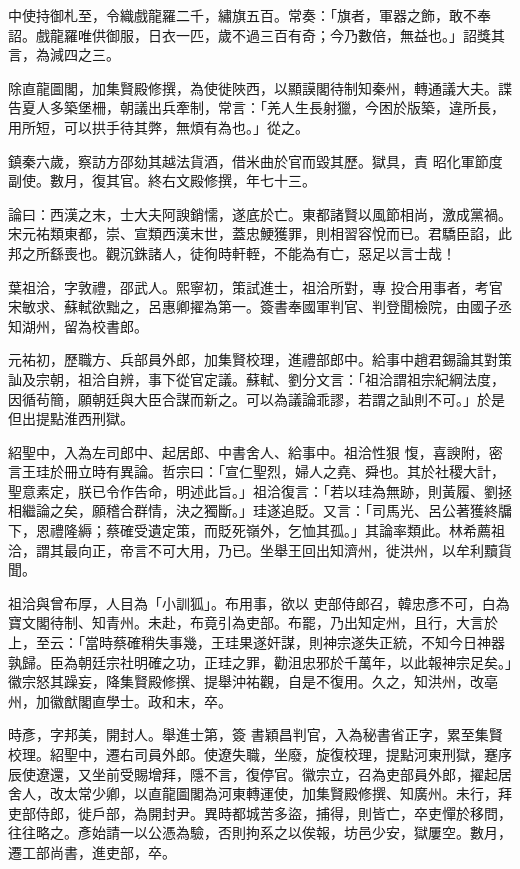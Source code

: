 \begin{pinyinscope}
 中使持御札至，令織戲龍羅二千，繡旗五百。常奏：「旗者，軍器之飾，敢不奉詔。戲龍羅唯供御服，日衣一匹，歲不過三百有奇；今乃數倍，無益也。」詔獎其言，為減四之三。



 除直龍圖閣，加集賢殿修撰，為使徙陜西，以顯謨閣待制知秦州，轉通議大夫。諜告夏人多築堡柵，朝議出兵牽制，常言：「羌人生長射獵，今困於版築，違所長，用所短，可以拱手待其弊，無煩有為也。」從之。



 鎮秦六歲，察訪方邵劾其越法貨酒，借米曲於官而毀其歷。獄具，責
 昭化軍節度副使。數月，復其官。終右文殿修撰，年七十三。



 論曰：西漢之末，士大夫阿諛銷懦，遂底於亡。東都諸賢以風節相尚，激成黨禍。宋元祐類東都，崇、宣類西漢末世，蓋忠鯁獲罪，則相習容悅而已。君驕臣諂，此邦之所繇喪也。觀沉銖諸人，徒徇時軒輊，不能為有亡，惡足以言士哉！



 葉祖洽，字敦禮，邵武人。熙寧初，策試進士，祖洽所對，專
 投合用事者，考官宋敏求、蘇軾欲黜之，呂惠卿擢為第一。簽書奉國軍判官、判登聞檢院，由國子丞知湖州，留為校書郎。



 元祐初，歷職方、兵部員外郎，加集賢校理，進禮部郎中。給事中趙君錫論其對策訕及宗朝，祖洽自辨，事下從官定議。蘇軾、劉分文言：「祖洽謂祖宗紀綱法度，因循茍簡，願朝廷與大臣合謀而新之。可以為議論乖謬，若謂之訕則不可。」於是但出提點淮西刑獄。



 紹聖中，入為左司郎中、起居郎、中書舍人、給事中。祖洽性狠
 愎，喜諛附，密言王珪於冊立時有異論。哲宗曰：「宣仁聖烈，婦人之堯、舜也。其於社稷大計，聖意素定，朕已令作告命，明述此旨。」祖洽復言：「若以珪為無跡，則黃履、劉拯相繼論之矣，願稽合群情，決之獨斷。」珪遂追貶。又言：「司馬光、呂公著獲終牖下，恩禮隆縟；蔡確受遺定策，而貶死嶺外，乞恤其孤。」其論率類此。林希薦祖洽，謂其最向正，帝言不可大用，乃已。坐舉王回出知濟州，徙洪州，以牟利黷貨聞。



 祖洽與曾布厚，人目為「小訓狐」。布用事，欲以
 吏部侍郎召，韓忠彥不可，白為寶文閣待制、知青州。未赴，布竟引為吏部。布罷，乃出知定州，且行，大言於上，至云：「當時蔡確稍失事幾，王珪果遂奸謀，則神宗遂失正統，不知今日神器孰歸。臣為朝廷宗社明確之功，正珪之罪，勸沮忠邪於千萬年，以此報神宗足矣。」徽宗怒其躁妄，降集賢殿修撰、提舉沖祐觀，自是不復用。久之，知洪州，改亳州，加徽猷閣直學士。政和末，卒。



 時彥，字邦美，開封人。舉進士第，簽
 書穎昌判官，入為秘書省正字，累至集賢校理。紹聖中，遷右司員外郎。使遼失職，坐廢，旋復校理，提點河東刑獄，蹇序辰使遼還，又坐前受賜增拜，隱不言，復停官。徽宗立，召為吏部員外郎，擢起居舍人，改太常少卿，以直龍圖閣為河東轉運使，加集賢殿修撰、知廣州。未行，拜吏部侍郎，徙戶部，為開封尹。異時都城苦多盜，捕得，則皆亡，卒吏憚於移問，往往略之。彥始請一以公憑為驗，否則拘系之以俟報，坊邑少安，獄屢空。數月，遷工部尚書，進吏部，卒。




\end{pinyinscope}
